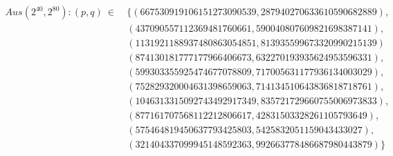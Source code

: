 \begin{refsegment}
\begin{equation*}
  \begin{split}
Aus (2^{40}, 2^{80}): (p,q)~\in~
            & \{ (667530919106151273090539,287940270633610590682889),\\
            &    (437090557112369481760661,590040807609821698387141),\\
            &    (1131921188937480863054851,813935599673320990215139)\\
            &    (874130181777177966406673,632270193935624953596331),\\
            &    (599303355925474677078809,717005631177936134003029),\\
            &    (752829320004631398659063,714134510643836818718761),\\
            &    (1046313315092743492917349,835721729660755006973833),\\
            &    (877161707568112212806617,42831503328261105793649),\\
            &    (575464819450637793425803, 5425832051159043433027),\\
            &    (321404337099945148592363,992663778486687980443879) \}\\
  \end{split}
\end{equation*}


\end{refsegment}
